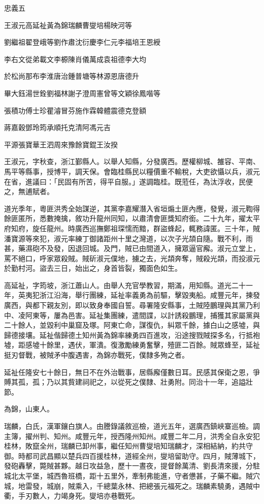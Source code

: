 
\begin{pinyinscope}
忠義五

王淑元高延祉黃為錦瑞麟曹燮培楊映河等

劉繼祖翟登峨等劉作肅沈衍慶李仁元李福培王恩綬

李右文從弟載文李榞陳肖儀萬成袁祖德李大均

於松尚那布李淮唐治鍾普塘等林源恩唐德升

畢大鈺湯世銓劉福林謝子澄周憲曾等文穎徐鳳喈等

張積功傅士珍瞿濬冒芬施作霖韓體震德克登額

蔣嘉穀鄧玲筠承順托克清阿馮元吉

平源張寶華王泗周來豫餘寶錕王汝揆

王淑元，字秋查，浙江鄞縣人。以舉人知縣，分發廣西。歷權柳城、雒容、平南、馬平等縣事，授博平，調天保。會臨桂縣民以糧價重不輸稅，大吏欲懾以兵，淑元在省，進議曰：「民固有所苦，得平自服。」遂調臨桂。既蒞任，為汰浮收，民便之，無逋賦者。

道光季年，粵匪洪秀全始謀逆，其黨李嘉耀潛入省垣煽土匪內應，發覺，淑元鞫得餘匪匿所，悉數掩擒，敘功升龍州同知，以肅清會匪獎知府銜。二十九年，擢太平府知府，旋任龍州。時廣西巡撫鄭祖琛懦而黯，群盜蜂起，輒務諱匿。三十年，賊潘寶源等來犯，淑元率練丁御諸距州十里之灣道，以次子光頡自隨。戰不利，雨甚，藥濕砲不及發，因退回城。及門，賊已由間道入，擁眾逼官廨。淑元立堂上，罵不絕口，呼家眾殺賊。賊斫淑元僕地，擄之去，光頡奔奪，賊殺光頡，而投淑元於勤村河。盜去三日，始出之，身首皆裂，獨面色如生。

高延祉，字筠坡，浙江蕭山人。由舉人充官學教習，期滿，用知縣。道光二十一年，英夷犯浙江沿海，舉行團練，延祉率義勇為前驅，擊毀夷船。咸豐元年，揀發廣西，與都下親友別，即以致身奉國自誓。尋署隆安縣事，土賊陸鵬理與其黨乃利中、凌阿東等，屢為邑害。延祉集團練，遣間諜，以計誘殺鵬理，捕獲其家屬黨與二十餘人，並毀利中巢窟及塚。阿東亡命，謀復仇，糾眾千餘，據白山之感墟，與歸德接壤。延祉偕歸德土知州黃為錦率練勇四百進攻，沿途搜戮賊探多名，行抵袍墟，距感墟十餘里，遇伏，軍潰。復激勵練勇奮擊，殪匪二百餘。賊眾蜂至，延祉挺刃督戰，被賊矛中腹遇害，為錦亦戰死，僕隸多殉之者。

延祉任隆安七十餘日，無日不在外治戰事，居縣廨僅數日耳。民感其保衛之恩，爭賻其孤，孤；乃以其貲建祠祀之，以從死之僕隸、壯勇附。同治十一年，追謚壯節。

為錦，山東人。

瑞麟，白氏，漢軍鑲白旗人。由謄錄議敘巡檢，道光五年，選廣西鎮峽寨巡檢。調主簿，擢州判、知州。咸豐元年，授西隆州知州。咸豐二年二月，洪秀全自永安犯桂林，敗竄全州，瑞麟已卸州事，繼任知州曹燮培知瑞麟才，深相結納，約共守御。時都司武昌顯以楚兵四百援桂林，道經全州，燮培留助守。四月，賊薄城下，發砲轟擊，斃賊甚夥。越日攻益急，歷十一晝夜，提督餘萬清、劉長清來援，分駐城北太平堡，城西魯班橋，距十五里外，牽制弗能進，守者憊甚，子藥不繼。賊穴城，地雷發，城崩，賊乘入，千總葉永林、把總張元福死之。瑞麟素驍勇，遇賊中衢，手刃數人，力竭身死。燮培亦巷戰死。


\end{pinyinscope}
